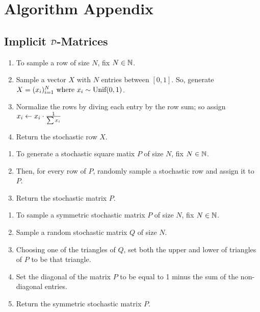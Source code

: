 
\chapter{Algorithm Appendix}

\section{Implicit $\mathcal{D}$-Matrices}

\begin{algorithm} \hfill
\begin{enumerate}
	\item To sample a row of size $N$, fix $N \in \mathbb{N}$. 
	\item Sample a vector $X$ with $N$ entries between $[0,1]$. So, generate $X = (x_i)_{i = 1}^N \text{ where } x_i \sim \text{Unif}(0,1)$.
	\item Normalize the rows by diving each entry by the row sum; so assign $x_i \leftarrow x_i \cdot \frac{1}{\sum{x_i}}$
	\item Return the stochastic row $X$.
\end{enumerate}
\end{algorithm}

\begin{algorithm} \hfill
\begin{enumerate}
	\item To generate a stochastic square matix $P$ of size $N$, fix $N \in \mathbb{N}$.
	\item Then, for every row of $P$, randomly sample a stochastic row and assign it to $P$.
	\item Return the stochastic matrix $P$.
\end{enumerate}
\end{algorithm}

\begin{algorithm} \hfill
\begin{enumerate}
	\item To sample a symmetric stochastic matrix $P$ of size $N$, fix $N \in \mathbb{N}$.
	\item Sample a random stochastic matrix $Q$ of size $N$.
	\item Choosing one of the triangles of $Q$, set both the upper and lower of triangles of $P$ to be that triangle.
	\item Set the diagonal of the matrix $P$ to be equal to 1 minus the sum of the non-diagonal entries.
	\item Return the symmetric stochastic matrix $P$.
\end{enumerate}
\end{algorithm}

